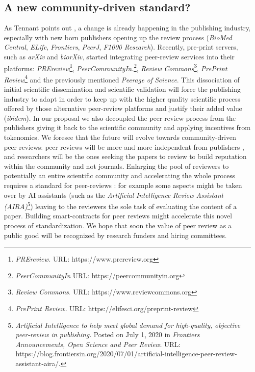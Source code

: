 \documentclass[runningheads]{llncs}
\begin{document}
\subsection{A new community-driven standard?}
As Tennant points out \cite{Tennant2017-F1000R}, a change is already happening in the publishing industry, especially with new born publishers opening up the review process (\emph{BioMed Central}, \emph{ELife}, \emph{Frontiers}, \emph{PeerJ}, \emph{F1000 Research}). Recently, pre-print servers, such as \emph{arXiv} and \emph{biorXiv}, started integrating peer-review services into their platforms: \emph{PREreview}\footnote[20]{\emph{PREreview.}  \textsc{URL:} https://www.prereview.org}, \emph{PeerCommunityIn.}\footnote[21]{\emph{PeerCommunityIn} \textsc{URL:} https://peercommunityin.org}, \emph{Review Commons}\footnote[22]{\emph{Review Commons.} \textsc{URL:} https://www.reviewcommons.org}, \emph{PrePrint Review}\footnote[23]{\emph{PrePrint Review.} \textsc{URL:} https://elifesci.org/preprint-review} and the previously mentioned \emph{Peerage of Science}. This dissociation of initial scientific dissemination and scientific validation will force the publishing industry to adapt in order to keep up with the higher quality scientific process offered by those alternative peer-review platforms and justify their added value (\emph{ibidem}). In our proposal we also decoupled the peer-review process from the publishers giving it back to the scientific community and applying incentives from tokenomics. We foresee that the future will evolve towards community-driven peer reviews: peer reviews will be more and more independent from publishers \cite{DecoupJ}, and researchers will be the ones seeking the papers to review to build reputation within the community and not journals.
\newline Enlarging the pool of reviewers to potentially an entire scientific community and accelerating the whole process requires a standard for peer-reviews \cite{UPR}: for example some aspects might be taken over by AI assistants (such as the \emph{Artificial Intelligence Review Assistant (AIRA)}\footnote[24]{\emph{Artificial Intelligence to help meet global demand for high-quality, objective peer-review in publishing.} Posted on July 1, 2020 in \emph{Frontiers Announcements, Open Science and Peer Review}. \textsc{URL:} https://blog.frontiersin.org/2020/07/01/artificial-intelligence-peer-review-assistant-aira/.}) leaving to the reviewers the sole task of evaluating the content of a paper. Building smart-contracts for peer reviews might accelerate this novel process of standardization. We hope that soon the value of peer review as a public good will be recognized by research funders and hiring committees.
\end{document}
